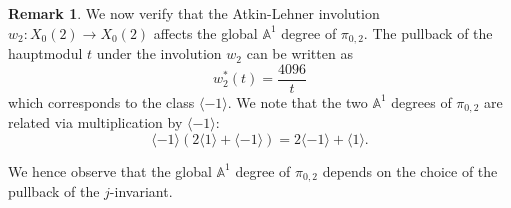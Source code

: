 \documentclass[12pt, reqno]{amsart}
\theoremstyle{definition}
\newtheorem{remark}[theorem]{Remark}
\newcommand{\A}{\mathbb{A}} %
\begin{document}
\begin{remark}
We now verify that the Atkin-Lehner involution $w_2: X_0(2) \to X_0(2)$ affects the global $\A^1$ degree of $\pi_{0,2}$. The pullback of the hauptmodul $t$ under the involution $w_2$ can be written as
\begin{equation*}
    w_2^*(t) = \frac{4096}{t}
\end{equation*}
which corresponds to the class $\langle -1 \rangle$. We note that the two $\A^1$ degrees of $\pi_{0,2}$ are related via multiplication by $\langle -1 \rangle$:
\begin{equation*}
    \langle -1 \rangle (2 \langle 1 \rangle + \langle -1 \rangle) = 2 \langle -1 \rangle + \langle 1 \rangle.
\end{equation*}

We hence observe that the global $\A^1$ degree of $\pi_{0,2}$ depends on the choice of the pullback of the $j$-invariant.
\end{remark}
\end{document}
